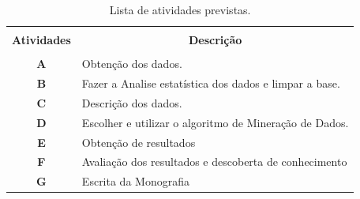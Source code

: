 \documentclass[tcc1]{uftex}
\begin{document}

\begin{table}[!h]
  \centering
  \caption{Lista de atividades previstas.}\label{tb:atividades}
  \begin{tabular}{cp{9.4cm}}
    \hline \hline &\\[-0.4cm]
    {\bf Atividades} & \multicolumn{1}{c}{\bf Descrição} \\
    \hline
    &\\[-0.4cm]
    \textbf{A} & Obtenção dos dados.\\[0.2cm]
    \textbf{B} & Fazer a Analise estatística dos dados e limpar a base.\\[0.2cm]
    \textbf{C} & Descrição dos dados.\\[0.2cm]
    \textbf{D} & Escolher e utilizar o algoritmo de Mineração de Dados.\\[0.2cm]
    \textbf{E} & Obtenção de resultados\\[0.2cm]
    \textbf{F} &  Avaliação dos resultados e descoberta de conhecimento\\[0.2cm]
    \textbf{G} &  Escrita da Monografia\\[0.2cm]
    \hline \hline
  \end{tabular}
\end{table}



\end{document}
